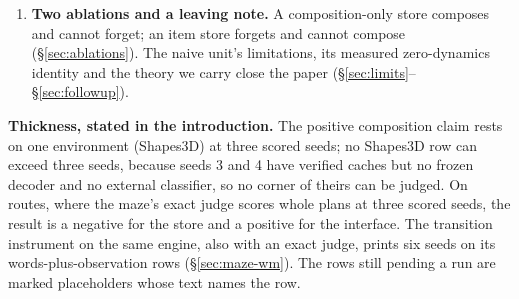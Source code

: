 \documentclass{article} %
\begin{document}
\begin{enumerate}[leftmargin=*,itemsep=2pt]
  +0.046). A colour-relational request coding lifts the store on every seed, but rivals handed the %
  same columns close most of that gap, so it is an input-representation result, not a store result
  (\S\ref{sec:maze-wm}). We offer the transition instrument itself as a minor contribution.
\item \textbf{Two ablations and a leaving note.} A composition-only store composes and cannot
  forget; an item store forgets and cannot compose (\S\ref{sec:ablations}). The naive unit's
  limitations, its measured zero-dynamics identity and the theory we carry close the paper
  (\S\ref{sec:limits}--\S\ref{sec:followup}).
\end{enumerate}

\noindent\textbf{Thickness, stated in the introduction.} The positive composition claim rests
on one environment (Shapes3D) at three scored seeds; no Shapes3D row can exceed three seeds,
because seeds 3 and 4 have verified caches but no frozen decoder and no external classifier, so no
corner of theirs can be judged. %
On routes, where the maze's exact judge scores whole plans at three scored seeds, the result is
a negative for the store and a positive for the interface. The transition instrument on the same
engine, also with an exact judge, prints six seeds on its words-plus-observation rows
(\S\ref{sec:maze-wm}). The rows still pending a run are marked placeholders whose text names the row.

\end{document}
